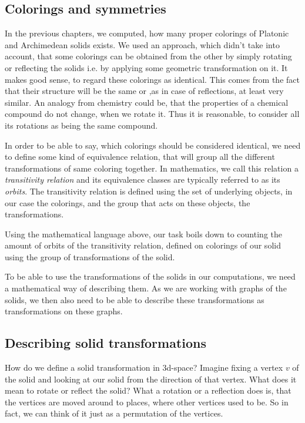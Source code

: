 \begin{highlight}

\chapter{Colorings and symmetries}

In the previous chapters, we computed, how many proper colorings of Platonic and Archimedean solids exists. We used an approach, which didn't take into account, that some colorings can be obtained from the other by simply rotating or reflecting the solids i.e. by applying some geometric transformation on it. It makes good sense, to regard these colorings as identical. This comes from the fact that their structure will be the same or ,as in case of reflections, at least very similar. An analogy from chemistry could be, that the properties of a chemical compound do not change, when we rotate it. Thus it is reasonable, to consider all its rotations as being the same compound. 

In order to be able to say, which colorings should be considered identical, we need to define some kind of equivalence relation, that will group all the different transformations of same coloring together. In mathematics, we call this relation a \textit{transitivity relation} and its equivalence classes are typically referred to as its \textit{orbits}. The transitivity relation is defined using the set of underlying objects, in our case the colorings, and the group that acts on these objects, the transformations.

Using the mathematical language above, our task boils down to counting the amount of orbits of the transitivity relation, defined on colorings of our solid using the group of transformations of the solid.

To be able to use the transformations of the solids in our computations, we need a mathematical way of describing them. As we are working with graphs of the solids, we then also need to be able to describe these transformations as transformations on these graphs.

\section{Describing solid transformations}

How do we define a solid transformation in 3d-space? Imagine fixing a vertex $v$ of the solid and looking at our solid from the direction of that vertex. What does it mean to rotate or reflect the solid? What a rotation or a reflection does is, that the vertices are moved around to places, where other vertices used to be. So in fact, we can think of it just as a permutation of the vertices. 


\end{highlight}
